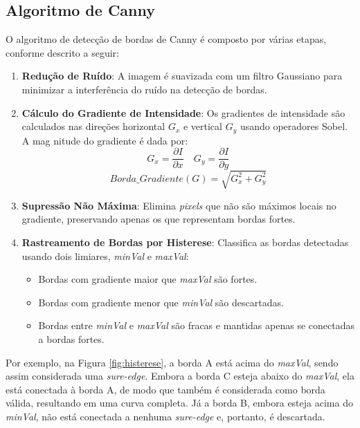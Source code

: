 \subsection{Algoritmo de Canny}

O algoritmo de detecção de bordas de Canny é composto por várias etapas, conforme descrito a seguir:

\begin{enumerate}
    \item \textbf{Redução de Ruído}: A imagem é suavizada com um filtro Gaussiano para minimizar a interferência do ruído na detecção de bordas.

    \item \textbf{Cálculo do Gradiente de Intensidade}: Os gradientes de intensidade são calculados nas direções horizontal \(G_x\) e vertical \(G_y\) usando operadores Sobel. A mag   nitude do gradiente é dada por:
    \[G_x = \frac{\partial I}{\partial x} \quad G_y = \frac{\partial I}{\partial y}\]
    \[Borda\_Gradiente(G) = \sqrt{G_{x}^{2} + G_{y}^{2}}\]

    \item \textbf{Supressão Não Máxima}: Elimina \textit{pixels} que não são máximos locais no gradiente, preservando apenas os que representam bordas fortes.

    \item \textbf{Rastreamento de Bordas por Histerese}: Classifica as bordas detectadas usando dois limiares, \textit{minVal} e \textit{maxVal}:
    \begin{itemize}
        \item Bordas com gradiente maior que \textit{maxVal} são fortes.
        \item Bordas com gradiente menor que \textit{minVal} são descartadas.
        \item Bordas entre \textit{minVal} e \textit{maxVal} são fracas e mantidas apenas se conectadas a bordas fortes.
    \end{itemize}
\end{enumerate}

Por exemplo, na Figura \autoref{fig:histerese}, a borda A está acima do \textit{maxVal}, sendo assim considerada uma \textit{sure-edge}. Embora a borda C esteja abaixo do \textit{maxVal}, ela está conectada à borda A, de modo que também é considerada como borda válida, resultando em uma curva completa. Já a borda B, embora esteja acima do \textit{minVal}, não está conectada a nenhuma \textit{sure-edge} e, portanto, é descartada.

